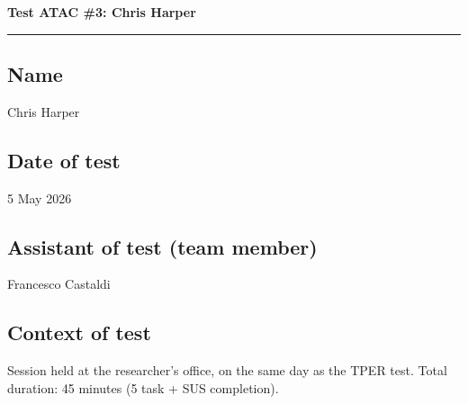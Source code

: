 ﻿\documentclass[11pt,a4paper]{article}
\begin{document}

\newpage
\begin{center}
  {\color{secondaryColor}\large\bfseries
  Test ATAC \#3: Chris Harper}\\
  \vspace{0.1cm}
  \color{borderColor}\hrule
\end{center}

\vspace{0.5cm}

\subsection*{Name}
\begin{tcolorbox}[base]
Chris Harper
\end{tcolorbox}

\subsection*{Date of test}
\begin{tcolorbox}[base]
5 May 2026
\end{tcolorbox}

\subsection*{Assistant of test (team member)}
\begin{tcolorbox}[base]
Francesco Castaldi
\end{tcolorbox}

\subsection*{Context of test}
\begin{tcolorbox}[base]
Session held at the researcher's office, on the same day as the TPER test. Total duration: 45 minutes (5 task + SUS completion).
\end{tcolorbox}
\end{document}
